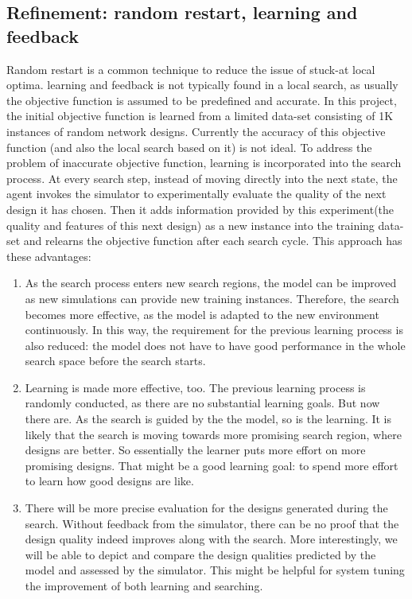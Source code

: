 \documentclass[12pt]{article}
\theoremstyle{definition}
\begin{document}
\subsection{Refinement: random restart, learning and feedback}
Random restart is a common technique to reduce the issue of stuck-at local optima. learning and feedback is not typically found in a local search, as usually the objective function is assumed to be predefined and accurate. In this project, the initial objective function is learned from a limited data-set consisting of 1K instances of random network designs. Currently the accuracy of this objective function (and also the local search based on it) is not ideal. To address the problem of inaccurate objective function, learning is incorporated into the search process. At every search step, instead of moving directly into the next state, the agent invokes the simulator to experimentally evaluate the quality of the next design it has chosen. Then it adds information provided by this experiment(the quality and features of this next design) as a new instance into the training data-set and relearns the objective function after each search cycle. This approach has these advantages:
\begin{enumerate}
  \item As the search process enters new search regions, the model can be improved as new simulations can provide new training instances. Therefore, the search becomes more effective, as the model is adapted to the new environment continuously. In this way, the requirement for the previous learning process is also reduced: the model does not have to have good performance in the whole search space before the search starts.
  \item Learning is made more effective, too. The previous learning process is randomly conducted, as there are no substantial learning goals. But now there are. As the search is guided by the the model, so is the learning. It is likely that the search is moving towards more promising search region, where designs are better. So essentially the learner puts more effort on more promising designs. That might be a good learning goal: to spend more effort to learn how good designs are like.
  \item There will be more precise evaluation for the designs generated during the search. Without feedback from the simulator, there can be no proof that the design quality indeed improves along with the search. More interestingly, we will be able to depict and compare the design qualities predicted by the model and assessed by the simulator. This might be helpful for system tuning the improvement of both learning and searching.
\end{enumerate}
\end{document}
